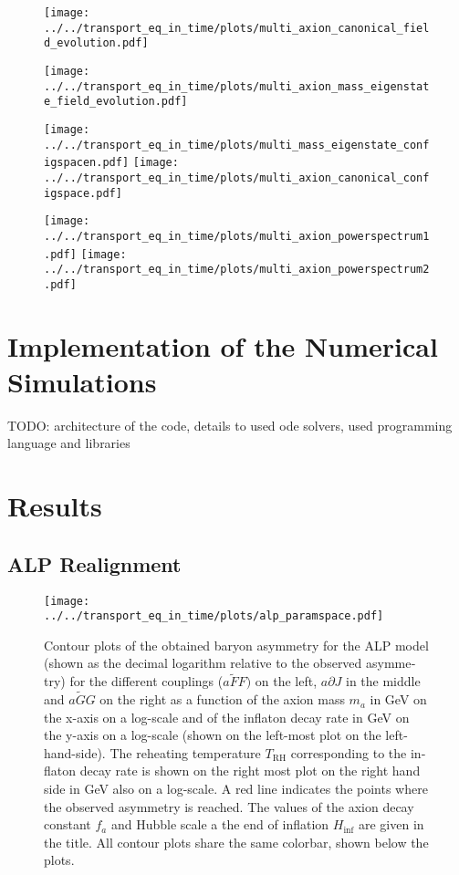 \documentclass[master,       %
               twoside,        %
               BCOR10mm,       %
               english,ngerman, %
               ]{GAUBM}
\begin{document}
\begin{otherlanguage}{english}
\begin{figure}[h]
    \texttt{[image: ../../transport\_eq\_in\_time/plots/multi\_axion\_canonical\_field\_evolution.pdf]}
    \caption{}
\end{figure}

\begin{figure}[h]
    \texttt{[image: ../../transport\_eq\_in\_time/plots/multi\_axion\_mass\_eigenstate\_field\_evolution.pdf]}
    \caption{}
\end{figure}

\begin{figure}[h]
    \texttt{[image: ../../transport\_eq\_in\_time/plots/multi\_mass\_eigenstate\_configspacen.pdf]}
    \texttt{[image: ../../transport\_eq\_in\_time/plots/multi\_axion\_canonical\_configspace.pdf]}
    \caption{}
\end{figure}

\begin{figure}[h]
    \texttt{[image: ../../transport\_eq\_in\_time/plots/multi\_axion\_powerspectrum1.pdf]}
    \texttt{[image: ../../transport\_eq\_in\_time/plots/multi\_axion\_powerspectrum2.pdf]}
    \caption{}
\end{figure}


\chapter{Implementation of the Numerical Simulations}
TODO: architecture of the code, details to used ode solvers, used programming language and libraries


\chapter{Results}

\section{ALP Realignment}

\begin{figure}[h]
    \texttt{[image: ../../transport\_eq\_in\_time/plots/alp\_paramspace.pdf]}
    \caption{Contour plots of the obtained baryon asymmetry  for the ALP model (shown as the decimal logarithm relative to the observed asymmetry) for the different couplings ($a\tilde{F}F)$ on the left, $a\partial J$ in the middle and $a \tilde{G} G$ on the right as a function of the axion mass $m_a$ in GeV on the x-axis on a log-scale and of the inflaton decay rate in GeV on the y-axis on a log-scale (shown on the left-most plot on the left-hand-side). The reheating temperature $T_\mathrm{RH}$ corresponding to the inflaton decay rate is shown on the right most plot on the right hand side in GeV also on a log-scale. A red line indicates the points where the observed asymmetry is reached. The values of the axion decay constant $f_a$ and Hubble scale a the end of inflation $H_\mathrm{inf}$ are given in the title. All contour plots share the same colorbar, shown below the plots.}
\end{figure}


\end{otherlanguage}
\end{document}
